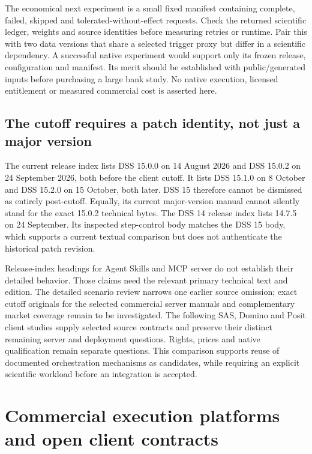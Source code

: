 The economical next experiment is a small fixed manifest containing complete,
failed, skipped and tolerated-without-effect requests. Check the returned
scientific ledger, weights and source identities before measuring retries or
runtime. Pair this with two data versions that share a selected trigger proxy
but differ in a scientific dependency. A successful native experiment would
support only its frozen release, configuration and manifest. Its merit should
be established with public/generated inputs before purchasing a large bank
study. No native execution, licensed entitlement or measured commercial cost
is asserted here.

\subsection{The cutoff requires a patch identity, not just a major version}
\label{exec23:dss-cutoff}

The current release index lists DSS 15.0.0 on 14 August 2026 and DSS 15.0.2 on
24 September 2026, both before the client cutoff. It lists DSS 15.1.0 on
8 October and DSS 15.2.0 on 15 October, both later. DSS 15 therefore cannot be
dismissed as entirely post-cutoff. Equally, its current major-version manual
cannot silently stand for the exact 15.0.2 technical bytes. The DSS 14 release
index lists 14.7.5 on 24 September. Its inspected step-control body matches
the DSS 15 body, which supports a current textual comparison but does not
authenticate the historical patch revision.
\citep{exec23_dss_latest_releases,exec23_dss_dss14_releases,
exec23_dss_latest_flow,exec23_dss_dss14_flow}

Release-index headings for Agent Skills and MCP server do not establish their
detailed behavior. Those claims need the relevant primary technical text and
edition. The detailed scenario review narrows one earlier source omission;
exact cutoff originals for the selected commercial server manuals and complementary market coverage remain to be investigated. The following SAS, Domino and Posit client studies supply selected source contracts and preserve their distinct remaining server and deployment questions. Rights,
prices and native qualification remain separate questions. This comparison
supports reuse of documented orchestration mechanisms as candidates, while
requiring an explicit scientific workload before an integration is accepted.


\section{Commercial execution platforms and open client contracts}
\label{exec23:clients-scope}

